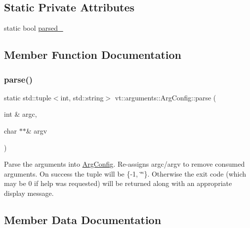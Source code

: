 \subsection*{Static Private Attributes}
\begin{DoxyCompactItemize}
\item 
static bool \hyperlink{structvt_1_1arguments_1_1_arg_config_a710f4894651d38778f924c5d5f340d96}{parsed\+\_\+}
\end{DoxyCompactItemize}


\subsection{Member Function Documentation}
\mbox{\label{structvt_1_1arguments_1_1_arg_config_a03db534c8fd127f38570a49425b6afbd}} 
\subsubsection{\texorpdfstring{parse()}{parse()}}
{\footnotesize\ttfamily static std\+::tuple$<$int, std\+::string$>$ vt\+::arguments\+::\+Arg\+Config\+::parse (\begin{DoxyParamCaption}\item[{int \&}]{argc,  }\item[{char $\ast$$\ast$\&}]{argv }\end{DoxyParamCaption})\hspace{0.3cm}{\ttfamily [static]}}

Parse the arguments into \hyperlink{structvt_1_1arguments_1_1_arg_config}{Arg\+Config}. Re-\/assigns argc/argv to remove consumed arguments. On success the tuple will be \{-\/1, \char`\"{}\char`\"{}\}. Otherwise the exit code (which may be 0 if help was requested) will be returned along with an appropriate display message. 

\subsection{Member Data Documentation}
\mbox{\label{structvt_1_1arguments_1_1_arg_config_aae77bdfe755eeaf6ea8d2f00dffc6077}} 
